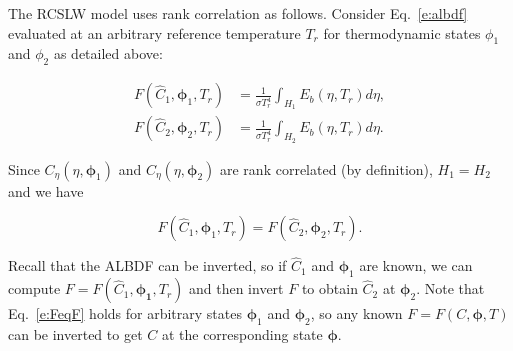 \documentclass[preprint,12pt]{elsarticle}
\newcommand{\BS}{\boldsymbol}
\begin{document}
    The RCSLW model uses rank correlation as follows.
    Consider Eq.~\ref{e:albdf} evaluated at an arbitrary reference temperature $T_r$ for thermodynamic states $\phi_1$ and $\phi_2$ as detailed above:
%
    \begin{linenomath}
        \begin{align}
            \label{e:albdf2}
            F(\hat{C}_1,\BS{\phi}_1,T_r) &= \frac{1}{\sigma T_r^4}\int_{H_1}E_b(\eta,T_r)d\eta, \\
            F(\hat{C}_2,\BS{\phi}_2,T_r) &= \frac{1}{\sigma T_r^4}\int_{H_2}E_b(\eta,T_r)d\eta.
        \end{align}
    \end{linenomath}
%
    Since $C_\eta(\eta,\BS{\phi}_1)$ and $C_\eta(\eta,\BS{\phi}_2)$ are rank correlated (by definition), $H_1=H_2$ and we have
%
    \begin{linenomath}
        \begin{equation}
            \label{e:FeqF}
            F(\hat{C}_1,\BS{\phi}_1,T_r)=F(\hat{C}_2,\BS{\phi}_2,T_r).
        \end{equation}
    \end{linenomath}
%
    Recall that the ALBDF can be inverted, so if $\hat{C}_1$ and $\BS{\phi}_1$ are known, we can compute $F=F(\hat{C}_1,\BS{\phi_1},T_r)$ and then invert $F$ to obtain $\hat{C}_2$ at $\BS{\phi}_2$. Note that Eq.~\ref{e:FeqF} holds for arbitrary states $\BS{\phi}_1$ and $\BS{\phi}_2$, so any known $F=F(C,\BS{\phi},T)$ can be inverted to get $C$ at the corresponding state $\BS{\phi}$.
\end{document}
